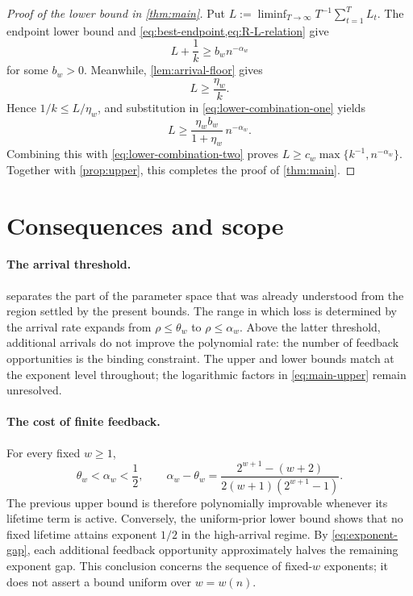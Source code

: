 \documentclass[11pt,letterpaper]{article}
\numberwithin{equation}{section}
\theoremstyle{definition}
\theoremstyle{remark}
\newcommand{\1}{\mathbf{1}}
\begin{document}
\begin{proof}[Proof of the lower bound in \cref{thm:main}]
Put $L:=\liminf_{T\to\infty}T^{-1}\sum_{t=1}^{T}L_t$.
The endpoint lower bound and \cref{eq:best-endpoint,eq:R-L-relation}
give
\begin{equation}\label{eq:lower-combination-one}
  L+\frac1k\ge b_w n^{-\alpha_w}
\end{equation}
for some $b_w>0$. Meanwhile, \cref{lem:arrival-floor} gives
\begin{equation}\label{eq:lower-combination-two}
  L\ge\frac{\eta_w}{k}.
\end{equation}
Hence $1/k\le L/\eta_w$, and substitution in
\cref{eq:lower-combination-one} yields
\[
  L\ge\frac{\eta_w b_w}{1+\eta_w}\,n^{-\alpha_w}.
\]
Combining this with \cref{eq:lower-combination-two} proves
$L\ge c_w\max\{k^{-1},n^{-\alpha_w}\}$.
Together with \cref{prop:upper}, this completes the proof of
\cref{thm:main}.
\end{proof}

\section{Consequences and scope}\label{sec:discussion}

\paragraph{The arrival threshold.}
 separates the part of the parameter space that was
already understood from the region settled by the present bounds.
The range in which loss is determined by the arrival rate expands
from $\rho\le\theta_w$ to $\rho\le\alpha_w$. Above the latter
threshold, additional arrivals do not improve the polynomial rate:
the number of feedback opportunities is the binding constraint.
The upper and lower bounds match at the exponent level throughout;
the logarithmic factors in \cref{eq:main-upper} remain unresolved.

\paragraph{The cost of finite feedback.}
For every fixed $w\ge1$,
\[
  \theta_w<\alpha_w<\frac12,
  \qquad
  \alpha_w-\theta_w
  =\frac{2^{w+1}-(w+2)}
         {2(w+1)(2^{w+1}-1)}.
\]
The previous upper bound is therefore polynomially improvable whenever
its lifetime term is active. Conversely, the uniform-prior lower bound
shows that no fixed lifetime attains exponent $1/2$ in the high-arrival
regime. By \cref{eq:exponent-gap}, each additional feedback opportunity
approximately halves the remaining exponent gap. This conclusion
concerns the sequence of fixed-$w$ exponents; it does not assert a
bound uniform over $w=w(n)$.
\end{document}
